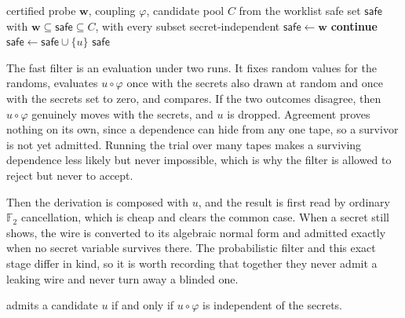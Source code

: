 \begin{algorithm}
\caption{Coupling-driven extension (Component III)}
\label{alg:extend}
\begin{minipage}{\linewidth}
\begin{algorithmic}[1]
  \Require certified probe $\mathbf{w}$, coupling $\varphi$, candidate pool $C$ from the worklist
  \Ensure safe set $\mathsf{safe}$ with $\mathbf{w} \subseteq \mathsf{safe} \subseteq C$, with every subset secret-independent
  \State $\mathsf{safe} \gets \mathbf{w}$
      \State \textbf{continue} 
    \EndIf
     
      \State $\mathsf{safe} \gets \mathsf{safe} \cup \{u\}$
    \EndIf
  \EndFor
  \State \Return $\mathsf{safe}$
\EndFunction
\end{algorithmic}
\end{minipage}
\end{algorithm}

  The fast filter is an evaluation under two runs. It fixes random values for the
  randoms, evaluates $u \circ \varphi$ once with the secrets also drawn at random and
  once with the secrets set to zero, and compares. If the two outcomes disagree, then $u \circ
  \varphi$ genuinely moves with the secrets, and $u$ is dropped. Agreement proves
  nothing on its own, since a dependence can hide from any one tape, so a survivor
  is not yet admitted. Running the trial over many tapes makes a surviving
  dependence less likely but never impossible, which is why the filter is
  allowed to reject but never to accept.

  Then the derivation is composed with $u$, and the
  result is first read by ordinary $\mathbb{F}_2$ cancellation, which is cheap and
  clears the common case. When a secret still shows, the wire is converted to its
  algebraic normal form and admitted exactly when no secret variable survives there.
  The probabilistic filter and this exact stage differ in kind, so it is worth
  recording that together they never admit a leaking wire and never turn away a
  blinded one.

  \begin{lemma}
  \label{lem:extend-exact}
   admits a candidate $u$ if and only if $u \circ \varphi$ is
  independent of the secrets.
  \end{lemma}

